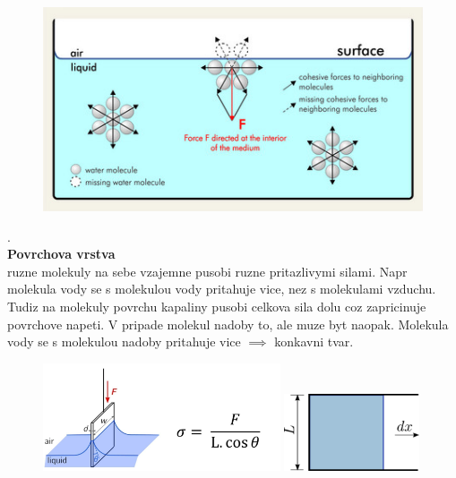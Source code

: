 \documentclass{report}
\begin{document}
\begin{figure}
  \vspace{-10pt}
  \includegraphics[width=\linewidth]{images/povrchova_vrstva.jpg}
\end{figure}%
. \\
\textbf{Povrchova vrstva} \\
ruzne molekuly na sebe vzajemne pusobi ruzne pritazlivymi silami. Napr molekula vody se s molekulou vody pritahuje vice, nez s molekulami vzduchu. Tudiz na molekuly povrchu kapaliny pusobi celkova sila dolu coz zapricinuje povrchove napeti. V pripade molekul nadoby to, ale muze byt naopak. Molekula vody se s molekulou nadoby pritahuje vice $\implies$ konkavni tvar.
\vspace{30pt}
\begin{figure}[!h]%
  \centering
  \includegraphics[width=7cm]{images/surface_tention.jpg}
  \quad
  \hspace{30pt}
  \includegraphics[width=4cm]{images/popoo_surface_tention.png}
\end{figure}
\end{document}
